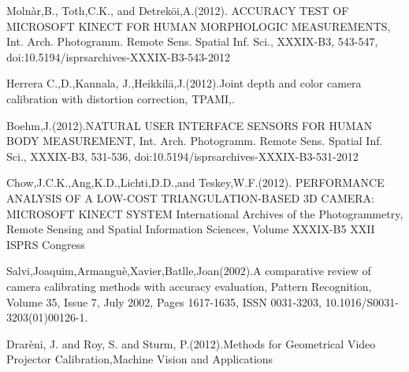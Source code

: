\begin{singlespace}
\begin{thebibliography}{10000000000}
Moln\`ar,B., Toth,C.K., and Detrek\"{o}i,A.(2012). ACCURACY TEST OF MICROSOFT KINECT FOR HUMAN MORPHOLOGIC MEASUREMENTS, Int. Arch. Photogramm. Remote Sens. Spatial Inf. Sci., XXXIX-B3, 543-547, doi:10.5194/isprsarchives-XXXIX-B3-543-2012

Herrera C.,D.,Kannala, J.,Heikkil\"{a},J.(2012).Joint depth and color camera calibration with distortion correction, TPAMI,.

Boehm,J.(2012).NATURAL USER INTERFACE SENSORS FOR HUMAN BODY MEASUREMENT, Int. Arch. Photogramm. Remote Sens. Spatial Inf. Sci., XXXIX-B3, 531-536, doi:10.5194/isprsarchives-XXXIX-B3-531-2012

Chow,J.C.K.,Ang,K.D.,Lichti,D.D.,and Teskey,W.F.(2012). 
PERFORMANCE ANALYSIS OF A LOW-COST TRIANGULATION-BASED 3D
CAMERA: MICROSOFT KINECT SYSTEM
International Archives of the Photogrammetry, Remote Sensing and Spatial Information Sciences, Volume XXXIX-B5
XXII ISPRS Congress

Salvi,Joaquim,Armangu\`e,Xavier,Batlle,Joan(2002).A comparative review of camera calibrating methods with accuracy evaluation, Pattern Recognition, Volume 35, Issue 7, July 2002, Pages 1617-1635, ISSN 0031-3203, 10.1016/S0031-3203(01)00126-1.

Drar\`eni, J. and  Roy, S. and Sturm, P.(2012).Methods for Geometrical Video Projector Calibration,Machine Vision and Applications

\end{thebibliography}
\end{singlespace}

